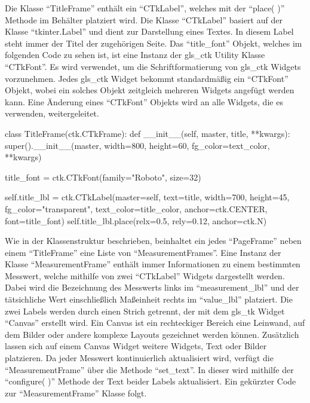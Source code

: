 Die Klasse \enquote{TitleFrame} enthält ein \enquote{CTkLabel}, welches mit der \enquote{place( )} Methode im Behälter platziert wird. Die Klasse \enquote{CTkLabel} basiert auf der Klasse \enquote{tkinter.Label} und dient zur Darstellung eines Textes. In diesem Label steht immer der Titel der zugehörigen Seite. Das \enquote{title\_font} Objekt, welches im folgenden Code zu sehen ist, ist eine Instanz der \gls{gls_ctk} Utility Klasse \enquote{CTkFont}. Es wird verwendet, um die Schriftformatierung von \gls{gls_ctk} Widgets vorzunehmen. Jedes \gls{gls_ctk} Widget bekommt standardmäßig ein \enquote{CTkFont} Objekt, wobei ein solches Objekt zeitgleich mehreren Widgets angefügt werden kann. Eine Änderung eines \enquote{CTkFont} Objekts wird an alle Widgets, die es verwenden, weitergeleitet. \cite[vgl.][]{Schimansky:o.J.}

\begin{pythoncode}
class TitleFrame(ctk.CTkFrame):
	def __init__(self, master, title, **kwargs):
		super().__init__(master, width=800, height=60, fg_color=text_color, **kwargs)
		
		title_font = ctk.CTkFont(family="Roboto", size=32)
		
		self.title_lbl = ctk.CTkLabel(master=self, text=title, width=700, height=45, fg_color="transparent", text_color=title_color, anchor=ctk.CENTER, font=title_font)
		self.title_lbl.place(relx=0.5, rely=0.12, anchor=ctk.N)
\end{pythoncode}

Wie in der Klassenstruktur beschrieben, beinhaltet ein jedes \enquote{PageFrame} neben einem \enquote{TitleFrame} eine Liste von \enquote{MeasurementFrames}. Eine Instanz der Klasse \enquote{MeasurementFrame} enthält immer Informationen zu einem bestimmten Messwert, welche mithilfe von zwei \enquote{CTkLabel} Widgets dargestellt werden. Dabei wird die Bezeichnung des Messwerts links im \enquote{measurement\_lbl} und der tätsichliche Wert einschließlich Maßeinheit rechts im \enquote{value\_lbl} platziert. Die zwei Labels werden durch einen Strich getrennt, der mit dem \gls{gls_tk} Widget \enquote{Canvas} erstellt wird. Ein Canvas ist ein rechteckiger Bereich \bzw eine Leinwand, auf dem Bilder oder andere komplexe Layouts gezeichnet werden können. Zusätzlich lassen sich auf einem Canvas Widget \zB weitere Widgets, Text oder Bilder platzieren. \cite[vgl.][20]{Shipman:2013} 
\newline Da jeder Messwert kontinuierlich aktualisiert wird, verfügt die \enquote{MeasurementFrame} über die Methode \enquote{set\_text}. In dieser wird mithilfe der \enquote{configure( )} Methode der Text beider Labels aktualisiert. Ein gekürzter Code zur \enquote{MeasurementFrame} Klasse folgt.

